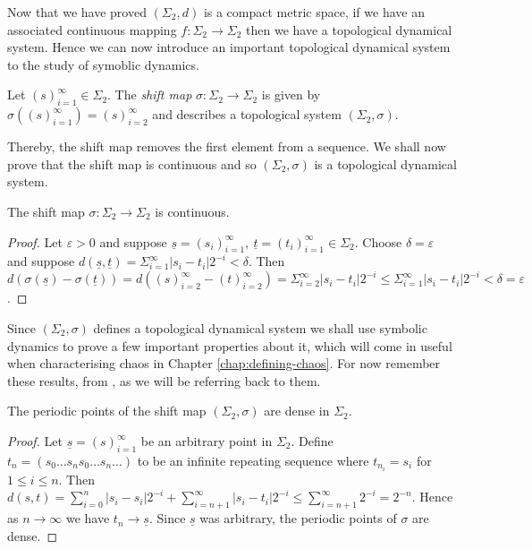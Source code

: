 Now that we have proved $(\Sigma_2, d)$ is a compact metric space, if we have an associated continuous mapping $f: \Sigma_2 \to \Sigma_2$ then we have a topological dynamical system. Hence we can now introduce an important topological dynamical system to the study of symoblic dynamics.

\begin{defn} 
    Let $(s)_{i=1}^{\infty} \in \Sigma_2$. The \emph{shift map} $\sigma: \Sigma_2 \to \Sigma_2$ is given by $\sigma \left((s)_{i=1}^{\infty}\right) = (s)_{i=2}^{\infty}$ and describes a topological system $(\Sigma_2, \sigma)$.
\end{defn}

Thereby, the shift map removes the first element from a sequence. We shall now prove that the shift map is continuous and so $(\Sigma_2, \sigma)$ is a topological dynamical system.

\begin{prop}
    The shift map $\sigma: \Sigma_2 \to \Sigma_2$ is continuous.
    \begin{proof}
        Let $\varepsilon > 0$ and suppose $\underline{s} = (s_i)_{i=1}^{\infty}, \ \underline{t} = (t_i)_{i=1}^{\infty} \in \Sigma_2$. Choose $\delta = \varepsilon$ and suppose $d(\underline{s}, \underline{t}) = \Sigma_{i=1}^{\infty}|s_i - t_i|2^{-i} < \delta$. Then $d\left( \sigma\left(\underline{s}\right) - \sigma\left(\underline{t}\right) \right) = d\left((s)_{i=2}^{\infty} - (t)_{i=2}^{\infty}\right) = \Sigma_{i=2}^{\infty}|s_i - t_i|2^{-i} \leq \Sigma_{i=1}^{\infty}|s_i - t_i|2^{-i} < \delta = \varepsilon$.
    \end{proof}
\end{prop}

Since $(\Sigma_2, \sigma)$ defines a topological dynamical system we shall use symbolic dynamics to prove a few important properties about it, which will come in useful when characterising chaos in Chapter \ref{chap:defining-chaos}. For now remember these results, from \cite[\S 1.6]{devaney}, as we will be referring back to them.

\begin{prop} \label{prop:shift-map-periodic-points-dense}
    The periodic points of the shift map $(\Sigma_2, \sigma)$ are dense in $\Sigma_2$.
    \begin{proof}
        Let $\underline{s} = (s)_{i=1}^{\infty}$ be an arbitrary point in $\Sigma_2$. Define $t_n = (s_0\dots s_ns_0\dots s_n\dots)$ to be an infinite repeating sequence where $t_{n_i} = s_i$ for $1 \leq i \leq n$. Then $d(s, t) = \sum_{i = 0}^n|s_i - s_i|2^{-i} + \sum_{i=n+1}^{\infty}|s_i - t_i|2^{-i} \leq \sum_{i = n+1}^{\infty}2^{-i} = 2^{-n}$. Hence as $n \to \infty$ we have $t_n \to \underline{s}$. Since $\underline{s}$ was arbitrary, the periodic points of $\sigma$ are dense.
    \end{proof}
\end{prop}

